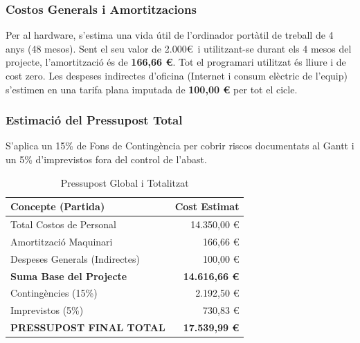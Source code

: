\subsubsection{Costos Generals i Amortitzacions}
Per al hardware, s'estima una vida útil de l'ordinador portàtil de treball de 4 anys (48 mesos). Sent el seu valor de 2.000\euro \ i utilitzant-se durant els 4 mesos del projecte, l'amortització és de \textbf{166,66 \euro}. Tot el programari utilitzat és lliure i de cost zero.
Les despeses indirectes d'oficina (Internet i consum elèctric de l'equip) s'estimen en una tarifa plana imputada de \textbf{100,00 \euro} per tot el cicle.

\subsubsection{Estimació del Pressupost Total}
S'aplica un 15\% de Fons de Contingència per cobrir riscos documentats al Gantt i un 5\% d'imprevistos fora del control de l'abast.

\begin{table}[H]
\centering
\caption{Pressupost Global i Totalitzat}
\begin{tabular}{@{}lr@{}}
\toprule
\textbf{Concepte (Partida)} & \textbf{Cost Estimat} \\ \midrule
Total Costos de Personal & 14.350,00 \euro \\
Amortització Maquinari & 166,66 \euro \\
Despeses Generals (Indirectes) & 100,00 \euro \\ \midrule
\textbf{Suma Base del Projecte} & \textbf{14.616,66 \euro} \\ \midrule
Contingències (15\%) & 2.192,50 \euro \\
Imprevistos (5\%) & 730,83 \euro \\ \midrule
\textbf{PRESSUPOST FINAL TOTAL} & \textbf{17.539,99 \euro} \\
\bottomrule
\end{tabular}
\end{table}

